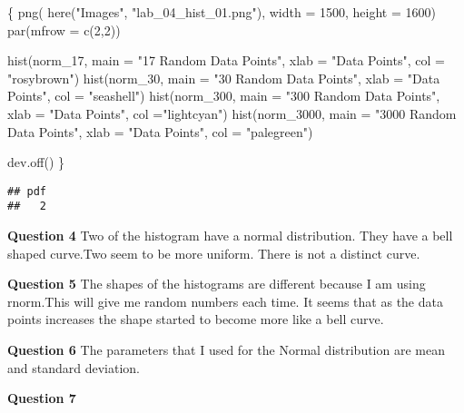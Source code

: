 \documentclass[
]{article}
\newenvironment{Shaded}{\begin{snugshade}}{\end{snugshade}}
\newcommand{\AttributeTok}[1]{\textcolor[rgb]{0.77,0.63,0.00}{#1}}
\newcommand{\DecValTok}[1]{\textcolor[rgb]{0.00,0.00,0.81}{#1}}
\newcommand{\FunctionTok}[1]{\textcolor[rgb]{0.00,0.00,0.00}{#1}}
\newcommand{\NormalTok}[1]{#1}
\newcommand{\StringTok}[1]{\textcolor[rgb]{0.31,0.60,0.02}{#1}}
\begin{document}
\begin{Shaded}
\begin{Highlighting}[]
\NormalTok{\{}
\FunctionTok{png}\NormalTok{(}
  \FunctionTok{here}\NormalTok{(}\StringTok{"Images"}\NormalTok{, }\StringTok{"lab\_04\_hist\_01.png"}\NormalTok{),}
  \AttributeTok{width =} \DecValTok{1500}\NormalTok{, }\AttributeTok{height =} \DecValTok{1600}\NormalTok{)}
\FunctionTok{par}\NormalTok{(}\AttributeTok{mfrow =} \FunctionTok{c}\NormalTok{(}\DecValTok{2}\NormalTok{,}\DecValTok{2}\NormalTok{))}

\FunctionTok{hist}\NormalTok{(norm\_17, }\AttributeTok{main =} \StringTok{"17 Random Data Points"}\NormalTok{, }\AttributeTok{xlab =} \StringTok{"Data Points"}\NormalTok{, }\AttributeTok{col =} \StringTok{"rosybrown"}\NormalTok{)}
\FunctionTok{hist}\NormalTok{(norm\_30,  }\AttributeTok{main =} \StringTok{"30 Random Data Points"}\NormalTok{, }\AttributeTok{xlab =} \StringTok{"Data Points"}\NormalTok{, }\AttributeTok{col =} \StringTok{"seashell"}\NormalTok{)}
\FunctionTok{hist}\NormalTok{(norm\_300,  }\AttributeTok{main =} \StringTok{"300 Random Data Points"}\NormalTok{, }\AttributeTok{xlab =} \StringTok{"Data Points"}\NormalTok{, }\AttributeTok{col =}\StringTok{"lightcyan"}\NormalTok{)}
\FunctionTok{hist}\NormalTok{(norm\_3000,  }\AttributeTok{main =} \StringTok{"3000 Random Data Points"}\NormalTok{, }\AttributeTok{xlab =} \StringTok{"Data Points"}\NormalTok{, }\AttributeTok{col =} \StringTok{"palegreen"}\NormalTok{)}

\FunctionTok{dev.off}\NormalTok{()}
\NormalTok{\}}
\end{Highlighting}
\end{Shaded}

\begin{verbatim}
## pdf 
##   2
\end{verbatim}

\textbf{Question 4} Two of the histogram have a normal distribution.
They have a bell shaped curve.Two seem to be more uniform. There is not
a distinct curve.

\textbf{Question 5} The shapes of the histograms are different because I
am using rnorm.This will give me random numbers each time. It seems that
as the data points increases the shape started to become more like a
bell curve.

\textbf{Question 6} The parameters that I used for the Normal
distribution are mean and standard deviation.

\textbf{Question 7}
\end{document}
